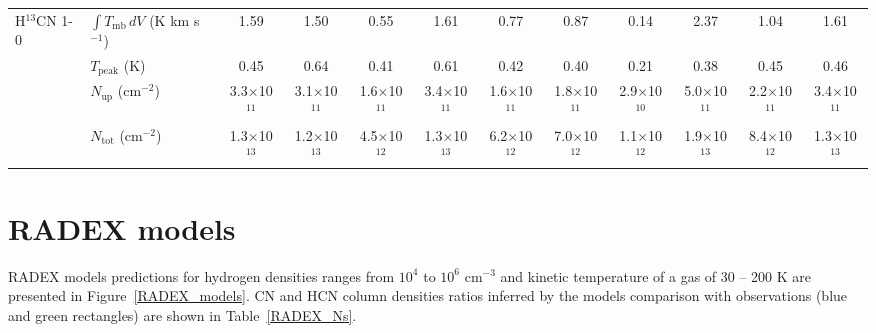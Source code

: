 \documentclass{aa}
\begin{document}
\begin{appendix}
\begin{sidewaystable*}
\begin{tabular}{l l c c c c c c c c c c}
\multirow{4}{*}{H$^{13}$CN 1-0} & $\int{T_{\mathrm{mb}} \, dV}$ (K km s$^{-1}$) & 1.59 & 1.50 & 0.55 & 1.61 & 0.77 & 0.87 & 0.14 & 2.37 & 1.04 & 1.61 \\
& $T_\mathrm{peak}$ (K) & 0.45 & 0.64 & 0.41 & 0.61 & 0.42 & 0.40 & 0.21 & 0.38 & 0.45 & 0.46 \\
& $N_\mathrm{up}$ (cm$^{-2}$) & 3.3$\times$10$^{11}$ & 3.1$\times$10$^{11}$ & 1.6$\times$10$^{11}$ & 3.4$\times$10$^{11}$ & 1.6$\times$10$^{11}$ & 1.8$\times$10$^{11}$ & 2.9$\times$10$^{10}$ & 5.0$\times$10$^{11}$ & 2.2$\times$10$^{11}$ & 3.4$\times$10$^{11}$ \\
& $N_\mathrm{tot}$ (cm$^{-2}$) & 1.3$\times$10$^{13}$ & 1.2$\times$10$^{13}$ & 4.5$\times$10$^{12}$ & 1.3$\times$10$^{13}$ & 6.2$\times$10$^{12}$ & 7.0$\times$10$^{12}$ & 1.1$\times$10$^{12}$ & 1.9$\times$10$^{13}$ & 8.4$\times$10$^{12}$ & 1.3$\times$10$^{13}$\\

\hline\hline
\end{tabular}
\end{sidewaystable*}

\section{RADEX models}
\label{app:radex}

RADEX models predictions for hydrogen densities ranges from $10^{4}$ to $10^{6}$ cm$^{-3}$ and kinetic temperature of a gas of 30 – 200 K are presented in Figure~\ref{RADEX_models}. CN and HCN column densities ratios inferred by the models comparison with observations (blue and green rectangles) are shown in Table~\ref{RADEX_Ns}.


\end{appendix}
\end{document}
